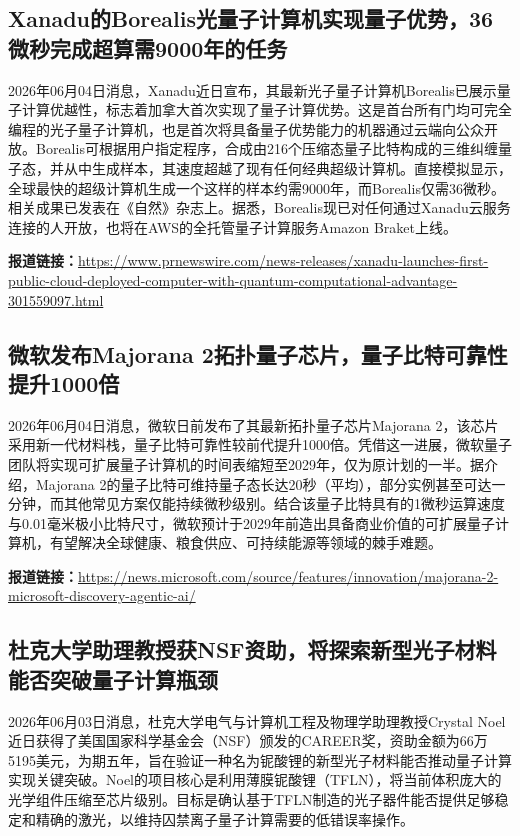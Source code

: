 \documentclass[12pt,a4paper]{ctexart}
\begin{document}
\subsection{ Xanadu的Borealis光量子计算机实现量子优势，36微秒完成超算需9000年的任务 }

2026年06月04日消息，Xanadu近日宣布，其最新光子量子计算机Borealis已展示量子计算优越性，标志着加拿大首次实现了量子计算优势。这是首台所有门均可完全编程的光子量子计算机，也是首次将具备量子优势能力的机器通过云端向公众开放。Borealis可根据用户指定程序，合成由216个压缩态量子比特构成的三维纠缠量子态，并从中生成样本，其速度超越了现有任何经典超级计算机。直接模拟显示，全球最快的超级计算机生成一个这样的样本约需9000年，而Borealis仅需36微秒。相关成果已发表在《自然》杂志上。据悉，Borealis现已对任何通过Xanadu云服务连接的人开放，也将在AWS的全托管量子计算服务Amazon Braket上线。

\noindent\textbf{报道链接：}\url{https://www.prnewswire.com/news-releases/xanadu-launches-first-public-cloud-deployed-computer-with-quantum-computational-advantage-301559097.html}

\subsection{ 微软发布Majorana 2拓扑量子芯片，量子比特可靠性提升1000倍 }

2026年06月04日消息，微软日前发布了其最新拓扑量子芯片Majorana 2，该芯片采用新一代材料栈，量子比特可靠性较前代提升1000倍。凭借这一进展，微软量子团队将实现可扩展量子计算机的时间表缩短至2029年，仅为原计划的一半。据介绍，Majorana 2的量子比特可维持量子态长达20秒（平均），部分实例甚至可达一分钟，而其他常见方案仅能持续微秒级别。结合该量子比特具有的1微秒运算速度与0.01毫米极小比特尺寸，微软预计于2029年前造出具备商业价值的可扩展量子计算机，有望解决全球健康、粮食供应、可持续能源等领域的棘手难题。

\noindent\textbf{报道链接：}\url{https://news.microsoft.com/source/features/innovation/majorana-2-microsoft-discovery-agentic-ai/}

\subsection{ 杜克大学助理教授获NSF资助，将探索新型光子材料能否突破量子计算瓶颈 }

2026年06月03日消息，杜克大学电气与计算机工程及物理学助理教授Crystal Noel近日获得了美国国家科学基金会（NSF）颁发的CAREER奖，资助金额为66万5195美元，为期五年，旨在验证一种名为铌酸锂的新型光子材料能否推动量子计算实现关键突破。Noel的项目核心是利用薄膜铌酸锂（TFLN），将当前体积庞大的光学组件压缩至芯片级别。目标是确认基于TFLN制造的光子器件能否提供足够稳定和精确的激光，以维持囚禁离子量子计算需要的低错误率操作。
\end{document}
